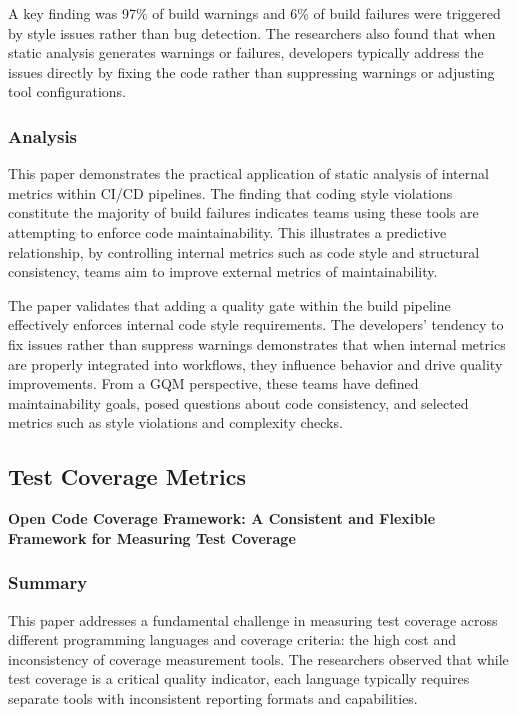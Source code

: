\documentclass[12pt]{article}
\begin{document}
A key finding was 97\% of build warnings and 6\% of build
failures were triggered by style issues rather than bug detection. The
researchers also found that when static analysis generates warnings
or failures, developers typically address the issues directly by
fixing the code rather than suppressing warnings or adjusting tool
configurations.

\subsubsection{Analysis}
This paper demonstrates the practical application
of static analysis of internal metrics within CI/CD pipelines. The finding
that coding style violations constitute the majority of build failures
indicates teams using these tools are attempting to enforce code
maintainability. This illustrates a predictive relationship, by
controlling internal metrics such as code style and structural consistency,
teams aim to improve external metrics of maintainability.

The paper validates that adding a quality gate within the build pipeline
effectively enforces internal code style requirements. The developers'
tendency to fix issues rather
than suppress warnings demonstrates that when internal metrics are
properly integrated into workflows, they influence behavior and drive
quality improvements. From a GQM perspective, these teams have defined
maintainability goals, posed questions about code consistency, and
selected metrics such as style violations and complexity checks.

\subsection{Test Coverage Metrics}

\textbf{Open Code Coverage Framework: A Consistent and
	Flexible Framework for Measuring Test Coverage} \cite{sakamoto2010open}

\subsubsection{Summary}
This paper addresses a fundamental challenge in
measuring test coverage across different programming languages and
coverage criteria: the high cost and inconsistency of coverage
measurement tools. The researchers observed that while test coverage
is a critical quality indicator, each language typically requires
separate tools with inconsistent reporting formats and capabilities.
\end{document}
